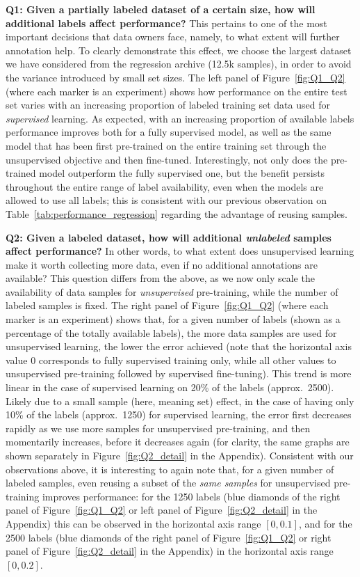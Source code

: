 \documentclass{article} \usepackage{iclr2021_conference,times}
\begin{document}
\textbf{Q1: Given a partially labeled dataset of a certain size, how will additional labels affect performance?} This pertains to one of the most important decisions that data owners face, namely, to what extent will further annotation help. To clearly demonstrate this effect, we choose the largest dataset we have considered from the regression archive (12.5k samples), in order to avoid the variance introduced by small set sizes. The left panel  of Figure~\ref{fig:Q1_Q2} (where each marker is an experiment) shows how performance on the entire test set varies with an increasing proportion of labeled training set data used for \textit{supervised} learning. As expected, with an increasing proportion of available labels performance improves both for a fully supervised model, as well as the same model that has been first pre-trained on the entire training set through the unsupervised objective and then fine-tuned. Interestingly, not only does the pre-trained model outperform the fully supervised one, but the benefit persists throughout the entire range of label availability, even when the models are allowed to use all labels; this is consistent with our previous observation on Table~\ref{tab:performance_regression} regarding the advantage of reusing samples.
    
\textbf{Q2: Given a labeled dataset, how will additional \textit{unlabeled} samples affect performance?} In other words, to what extent does unsupervised learning make it worth collecting more data, even if no additional annotations are available?  
This question differs from the above, as we now only scale the availability of data samples for \textit{unsupervised} pre-training, while the number of labeled samples is fixed. The right panel of Figure~\ref{fig:Q1_Q2} (where each marker is an experiment) shows that, for a given number of labels (shown as a percentage of the totally available labels), the more data samples are used for unsupervised learning, the lower the error achieved (note that the horizontal axis value 0 corresponds to fully supervised training only, while all other values to unsupervised pre-training followed by supervised fine-tuning). This trend is more linear in the case of supervised learning on 20\% of the labels (approx.\ 2500). Likely due to a small sample (here, meaning set) effect, in the case of having only 10\% of the labels (approx.\ 1250) for supervised learning, the error first decreases rapidly as we use more samples for unsupervised pre-training, and then momentarily increases, before it decreases again (for clarity, the same graphs are shown separately in Figure~\ref{fig:Q2_detail} in the Appendix).
Consistent with our observations above, it is interesting to again note that, for a given number of labeled samples, even reusing a subset of the \textit{same samples} for unsupervised pre-training improves performance: for the 1250 labels (blue diamonds of the right panel of Figure~\ref{fig:Q1_Q2} or left panel of Figure~\ref{fig:Q2_detail} in the Appendix) this can be observed in the horizontal axis range $[0, 0.1]$, and for the 2500 labels (blue diamonds of the right panel of Figure~\ref{fig:Q1_Q2} or right panel of Figure~\ref{fig:Q2_detail} in the Appendix) in the horizontal axis range $[0, 0.2]$.
\end{document}
